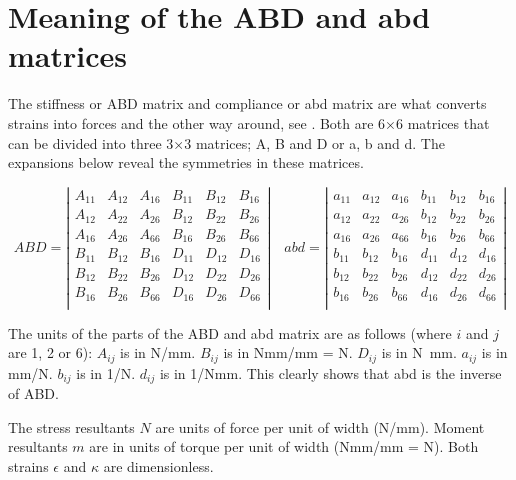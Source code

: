 \documentclass[a4paper,landscape,oneside,11pt,twocolumn]{memoir}
\begin{document}
\section{Meaning of the ABD and abd matrices} %

The stiffness or ABD matrix and compliance or abd matrix are what converts
strains into forces and the other way around, see
.  Both are 6×6 matrices that can be divided
into three 3×3 matrices; A, B and D or a, b and d.
The expansions below reveal the symmetries in these matrices.

\[
    ABD = \left|\begin{array}{cccccc}
        A_{11} & A_{12} & A_{16} & B_{11} & B_{12} & B_{16}\\
        A_{12} & A_{22} & A_{26} & B_{12} & B_{22} & B_{26}\\
        A_{16} & A_{26} & A_{66} & B_{16} & B_{26} & B_{66}\\
        B_{11} & B_{12} & B_{16} & D_{11} & D_{12} & D_{16}\\
        B_{12} & B_{22} & B_{26} & D_{12} & D_{22} & D_{26}\\
        B_{16} & B_{26} & B_{66} & D_{16} & D_{26} & D_{66}\\
    \end{array}\right|\quad
    abd = \left|\begin{array}{cccccc}
        a_{11} & a_{12} & a_{16} & b_{11} & b_{12} & b_{16}\\
        a_{12} & a_{22} & a_{26} & b_{12} & b_{22} & b_{26}\\
        a_{16} & a_{26} & a_{66} & b_{16} & b_{26} & b_{66}\\
        b_{11} & b_{12} & b_{16} & d_{11} & d_{12} & d_{16}\\
        b_{12} & b_{22} & b_{26} & d_{12} & d_{22} & d_{26}\\
        b_{16} & b_{26} & b_{66} & d_{16} & d_{26} & d_{66}\\
    \end{array}\right|
\]

The units of the parts of the ABD and abd matrix are as follows (where $i$ and
$j$ are 1, 2 or 6): $A_{ij}$ is in \si{N/mm}. $B_{ij}$ is in \si{Nmm/mm}
= \si{N}.  $D_{ij}$ is in \si{N.mm}.  $a_{ij}$ is in \si{mm/N}.  $b_{ij}$ is
in \si{1/N}.  $d_{ij}$ is in \si{1/Nmm}. This clearly shows that abd is the
inverse of ABD.

The stress resultants $N$ are units of force per unit of width (\si{N/mm}).
Moment resultants $m$ are in units of torque per unit of width (\si{Nmm/mm}
= \si{N}). Both strains $\epsilon$ and $\kappa$ are dimensionless.
\end{document}
